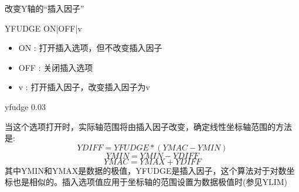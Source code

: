 \label{cmd:yfudge}

改变Y轴的``插入因子''

\begin{SACSTX}
YFUDGE ON|OFF|v
\end{SACSTX}

\begin{itemize}
\item ON : 打开插入选项，但不改变插入因子 
\item OFF : 关闭插入选项 
\item v : 打开插入因子，改变插入因子为v 
\end{itemize}

\begin{SACDFT}
yfudge 0.03
\end{SACDFT}

当这个选项打开时，实际轴范围将由插入因子改变，确定线性坐标轴范围的方法是:
\[ YDIFF=YFUDGE*(YMAC-YMIN) \]
\[ YMIN=YMIN-YDIFF \]
\[ YMAC=YMAX+YDIFF \]
其中YMIN和YMAX是数据的极值，YFUDGE是插入因子，这个算法对于对数坐标也是相似的。插入选项值应用于坐标轴的范围设置为数据极值时(参见YLIM)

